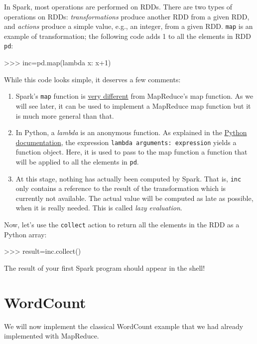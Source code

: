 \documentclass[11pt]{article}
\begin{document}
In Spark, most operations are performed on RDDs. There are two types
of operations on RDDs: \emph{transformations} produce another RDD from
a given RDD, and \emph{actions} produce a simple value, e.g., an
integer, from a given RDD. \texttt{map} is an example of
transformation; the following code adds 1 to all the elements in RDD
\texttt{pd}:
\begin{cli}
  >>> inc=pd.map(lambda x: x+1)
\end{cli}
While this code looks simple, it deserves a few comments:
\begin{enumerate}
\item Spark's \texttt{map} function is \underline{very different} from
  MapReduce's map function. As we will see later, it can be used to
  implement a MapReduce map function but it is much more general than
  that.
\item In Python, a \emph{lambda} is an anonymous function. As
  explained in the
  \href{https://docs.python.org/2/reference/expressions.html#lambda}{Python
    documentation}, the expression \texttt{lambda arguments:
    expression} yields a function object. Here, it is used to pass to
  the map function a function that will be applied to all the elements
  in \texttt{pd}.
  \item At this stage, nothing has actually been computed by
    Spark. That is, \texttt{inc} only contains a reference to the
    result of the transformation which is currently not available. The
    actual value will be computed as late as possible, when it is
    really needed. This is called \emph{lazy evaluation}. 
\end{enumerate}

Now, let's use the \texttt{collect} action to return all the elements
in the RDD as a Python array:
\begin{cli}
  >>> result=inc.collect()
\end{cli}

The result of your first Spark program should appear in the shell!

\section{WordCount}

We will now implement the classical WordCount example that we had already
implemented with MapReduce.
\end{document}
